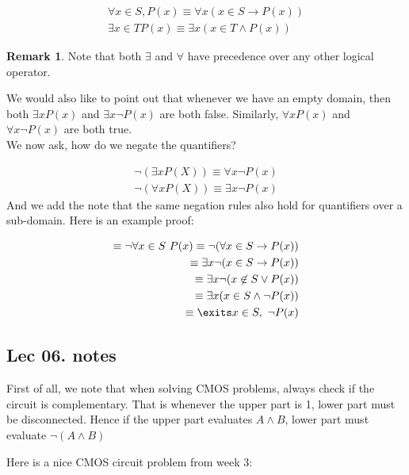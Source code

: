 \documentclass{article}
\theoremstyle{definition}
\newtheorem{remark}{Remark}
\numberwithin{equation}{subsection}
\numberwithin{remark}{subsection}
\begin{document}
\begin{align}
    \forall x \in S, P(x) \equiv \forall x(x\in S \rightarrow P(x))\\
    \exists x \in T P(x) \equiv \exists x( x\in T \land P(x))
\end{align}

\begin{remark}
Note that both $\exists$ and $\forall$ have precedence over any other logical operator. 
\end{remark}

We would also like to point out that whenever we have an empty domain, then both $\exists x P(x)$ and $\exists x \neg P(x)$ are both false. Similarly, $\forall x P(x)$ and $\forall x \neg P(x)$ are both true. 
\\
We now ask, how do we negate the quantifiers?

\begin{align}
    \neg(\exists x P(X)) \equiv \forall x \neg P(x)\\
    \neg(\forall x P(X)) \equiv \exists x \neg P(x) 
\end{align}
And we add the note that the same negation rules also hold for quantifiers over a sub-domain. Here is an example proof:

\begin{align*}
    \equiv \neg \forall x \in S \ P(x) \equiv \neg (\forall x \in S \rightarrow P(x))\\
    \equiv \exists x \neg(x \in S \rightarrow P(x))\\
    \equiv \exists x \neg(x \not \in S \lor P(x))\\
    \equiv \exists x (x \in S \land \neg P(x))\\
    \equiv \exits x \in S, \ \neg P(x)
\end{align*}

\subsection{Lec 06. notes}

First of all, we note that when solving CMOS problems, always check if the circuit is complementary. That is whenever the upper part is 1, lower part must be disconnected. Hence if the upper part evaluates $A\land B$, lower part must evaluate $\neg(A \land B)$

Here is a nice CMOS circuit problem from week 3:
\end{document}
